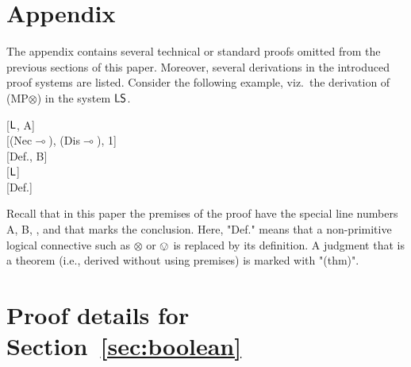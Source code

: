 \documentclass[a4paper,english,fleqn,11pt,final]{scrartcl}
\makeatletter
\newcommand{\ie}{i.e.\@\xspace}
\newcommand{\negg}{{\sim}}
\newcommand{\sfS}{\protect\ensuremath{\mathsf{S}}}
\newcommand{\sfL}{\protect\ensuremath{\mathsf{L}}}
\newcommand{\limp}{\multimap}
\newcommand{\timp}{\rightarrowtriangle}
\newcommand{\tens}{\otimes}
\newcommand{\Deriv}[1]{{\normalfont\textsf{#1}}}
\theoremstyle{plain}
\theoremstyle{definition}
\newcommand{\thm}{\text{\scriptsize\; (thm)}}
\makeatother
\begin{document}
\printbibliography

\clearpage

\appendix

\renewcommand*{\thesection}{\Alph{section}}



\section*{Appendix}

The appendix contains several technical or standard proofs omitted from the previous sections of this paper.
Moreover, several derivations in the introduced proof systems are listed.
Consider the following example, viz.\ the derivation of \Deriv{(MP$\tens$)} in the system $\sfL\sfS$.

\medskip

{
\setlength{\fitchprfwidth}{2.2in}
\fitchprf{
\pline[A ]{\varphi \timp \psi \thm} \\
\pline[B ]{\vartheta \tens \varphi}
}
{
\pline[1 ]{\negg \psi \timp \negg \varphi \thm }[$\sfL$, A]\\
\pline[2 ]{(\vartheta\limp\negg\psi)\timp(\vartheta \limp \negg\varphi) \thm}[\Deriv{(Nec$\limp$)}, \Deriv{(Dis$\limp$)}, 1]\\
\pline[3 ]{\negg(\vartheta \limp \negg \varphi)}[Def., B]\\
\pline[4 ]{\negg(\vartheta\limp\negg\psi)}[$\sfL$]\\
\pline[\slider]{\vartheta \tens \psi}[Def.]
}
}

\medskip


Recall that in this paper the premises of the proof have the special line numbers A, B, \textellipsis, and that \slider marks the conclusion.
Here, "Def." means that a non-primitive logical connective such as $\tens$ or $\ovee$ is replaced by its definition.
A judgment that is a theorem (\ie, derived without using premises) is marked with "{\scriptsize(thm)}".

\section{Proof details for Section~\ref{sec:boolean}}
\end{document}
